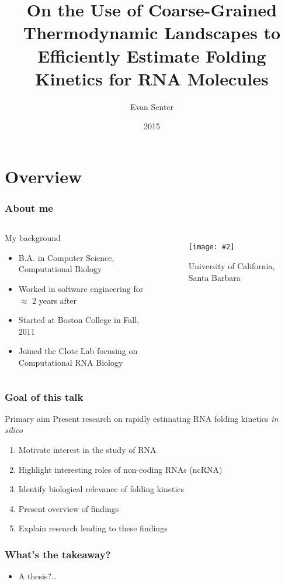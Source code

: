 \documentclass{beamer}
\title[Coarse-Grained RNA Folding Kinetics]{On the Use of Coarse-Grained Thermodynamic Landscapes to Efficiently Estimate Folding Kinetics for RNA Molecules}
\author{Evan Senter}
\date{2015}
\newcommand{\slidefigure}[2][1]{\texttt{[image: \#2]}}
\begin{document}
\frame{\titlepage}

\section{Overview}

\begin{frame}
	\frametitle{About me}
	\begin{columns}
		\begin{block}
			{My background}
			\begin{itemize}
				\item B.A. in Computer Science, Computational Biology
				\item Worked in software engineering for $\approx$ 2 years after
				\item Started at Boston College in Fall, 2011
				\item Joined the Clote Lab focusing on Computational RNA Biology
			\end{itemize}
		\end{block}

		\begin{figure}
			\centering \slidefigure{ucsb} \caption{University of California, Santa Barbara}
		\end{figure}
	\end{columns}
\end{frame}

\begin{frame}
	\frametitle{Goal of this talk}
	\begin{block}
		{Primary aim} Present research on rapidly estimating RNA folding kinetics {\em in silico}
	\end{block}
	\begin{enumerate}
		\item Motivate interest in the study of RNA
		\item Highlight interesting roles of non-coding RNAs (ncRNA)
		\item Identify biological relevance of folding kinetics
		\item Present overview of findings
		\item Explain research leading to these findings
	\end{enumerate}
\end{frame}

\begin{frame}
	\frametitle{What's the takeaway?}
	\begin{itemize}
		\pause
		\item A thesis?\dots
	\end{itemize}
\end{frame}
\end{document}
